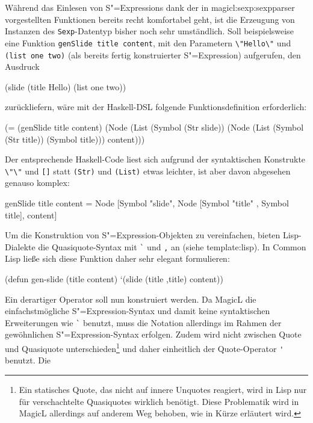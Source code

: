 \documentclass[12pt, a4paper, bibgerm]{scrbook}
\newenvironment{DIFnomarkup}{}{}
\newcommand\icode[1]{\lstinline?#1?}
\newcommand\sref{}
\newcommand{\sees}[1]{(siehe \sref{#1})}
\newcommand{\sexp}{S"=Expression}
\newcommand{\sexps}{S"=Expressions}
\begin{document}
Während das Einlesen von \sexps{} dank der in
\sref{magicl:sexp:sexpparser} vorgestellten Funktionen bereits recht
komfortabel geht, ist die Erzeugung von Instanzen des
\icode{Sexp}-Datentyp bisher noch sehr umständlich. Soll beispielsweise eine
Funktion \icode{genSlide title content}, mit den Parametern
\icode{\"Hello\"} und \icode{(list one two)} (als bereits fertig
konstruierter \sexp{}) aufgerufen, den Ausdruck
\begin{DIFnomarkup}\begin{code}
(slide (title Hello) (list one two))
\end{code}\end{DIFnomarkup}
zurückliefern, wäre mit der Haskell-DSL folgende Funktionsdefinition
erforderlich:
\begin{DIFnomarkup}\begin{code}
(= (genSlide title content)
   (Node (List (Symbol (Str slide))
               (Node (List (Symbol (Str title)) (Symbol title)))
               content)))
\end{code}\end{DIFnomarkup}
Der entsprechende Haskell-Code liest sich aufgrund der syntaktischen
Konstrukte \icode{\"\"} und \icode{[]} statt \icode{(Str)} und
\icode{(List)} etwas leichter, ist aber davon abgesehen genauso komplex:
\begin{DIFnomarkup}\begin{code}
genSlide title content =
   Node [Symbol "slide",
         Node [Symbol "title" , Symbol title],
         content]
\end{code}\end{DIFnomarkup}
Um die Konstruktion von \sexp{}-Objekten zu vereinfachen, bieten
Lisp-Dialekte die Quasiquote-Syntax mit \icode{`} und \icode{,} an
\sees{template:lisp}. In Common Lisp ließe sich diese
Funktion daher sehr elegant formulieren:
\begin{DIFnomarkup}\begin{code}
(defun gen-slide (title content)
  `(slide (title ,title) content))
\end{code}\end{DIFnomarkup}
Ein derartiger Operator soll nun konstruiert werden. Da MagicL die
einfachstmögliche \sexp{}-Syntax und damit keine syntaktischen
Erweiterungen wie \icode{`} benutzt, muss die Notation allerdings im
Rahmen der gewöhnlichen \sexp{}-Syntax erfolgen. Zudem wird nicht
zwischen Quote und Quasiquote unterschieden\footnote{Ein statisches
  Quote, das nicht auf innere Unquotes reagiert, wird in Lisp nur für
  verschachtelte Quasiquotes wirklich benötigt. Diese Problematik wird
  in MagicL allerdings auf anderem Weg behoben, wie in Kürze erläutert
  wird.} und daher einheitlich der Quote-Operator \icode{'} benutzt. Die
\end{document}
